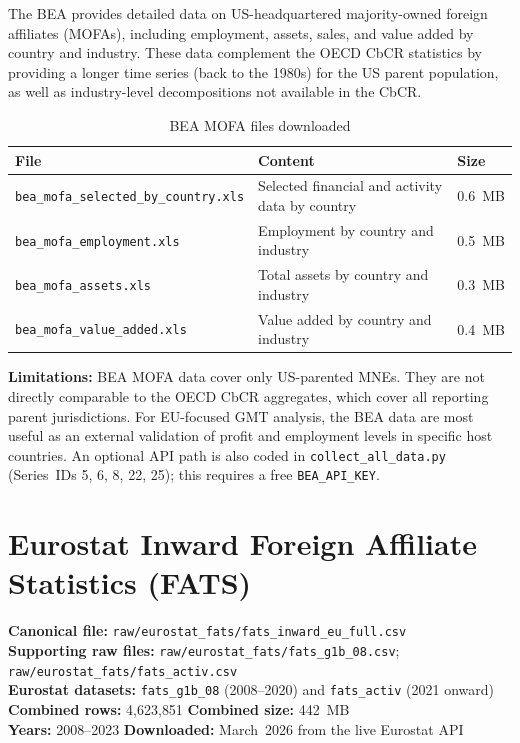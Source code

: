 \documentclass[11pt,a4paper]{article}
\begin{document}
The BEA provides detailed data on US-headquartered majority-owned foreign affiliates (MOFAs), including employment, assets, sales, and value added by country and industry.  These data complement the OECD CbCR statistics by providing a longer time series (back to the 1980s) for the US parent population, as well as industry-level decompositions not available in the CbCR.

\begin{table}[H]
\centering
\caption{BEA MOFA files downloaded}\label{tab:bea_files}
\begin{tabular}{@{}L{5.5cm} L{6.5cm} C{1.5cm}@{}}
\toprule
\textbf{File} & \textbf{Content} & \textbf{Size} \\
\midrule
\texttt{bea\_mofa\_selected\_by\_country.xls}  & Selected financial and activity data by country & 0.6~MB \\
\texttt{bea\_mofa\_employment.xls}             & Employment by country and industry & 0.5~MB \\
\texttt{bea\_mofa\_assets.xls}                 & Total assets by country and industry & 0.3~MB \\
\texttt{bea\_mofa\_value\_added.xls}           & Value added by country and industry & 0.4~MB \\
\bottomrule
\end{tabular}
\end{table}

\noindent\textbf{Limitations:} BEA MOFA data cover only US-parented MNEs.  They are not directly comparable to the OECD CbCR aggregates, which cover all reporting parent jurisdictions.  For EU-focused GMT analysis, the BEA data are most useful as an external validation of profit and employment levels in specific host countries.  An optional API path is also coded in \texttt{collect\_all\_data.py} (Series~IDs 5, 6, 8, 22, 25); this requires a free \texttt{BEA\_API\_KEY}.


\section{Eurostat Inward Foreign Affiliate Statistics (FATS)}\label{sec:fats}

\textbf{Canonical file:} \texttt{raw/eurostat\_fats/fats\_inward\_eu\_full.csv}\\
\textbf{Supporting raw files:} \texttt{raw/eurostat\_fats/fats\_g1b\_08.csv};\quad
\texttt{raw/eurostat\_fats/fats\_activ.csv}\\
\textbf{Eurostat datasets:} \texttt{fats\_g1b\_08} (2008--2020) and \texttt{fats\_activ} (2021 onward)\\
\textbf{Combined rows:} 4{,}623{,}851 \quad \textbf{Combined size:} 442~MB\\
\textbf{Years:} 2008--2023 \quad \textbf{Downloaded:} March~2026 from the live Eurostat API
\end{document}
